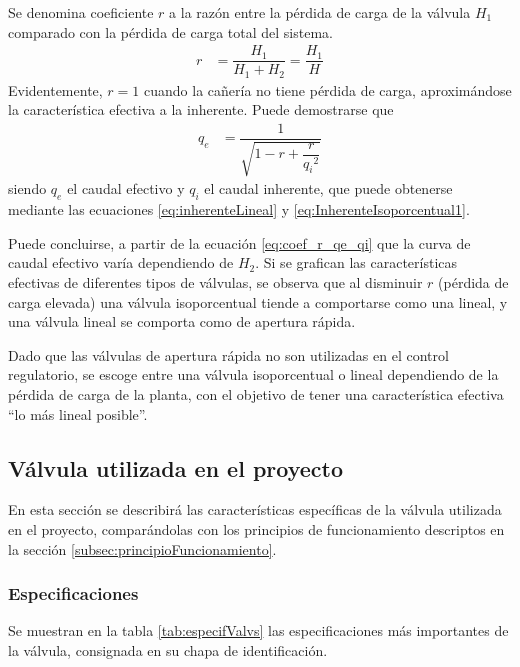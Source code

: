 Se denomina coeficiente $r$ a la razón entre la pérdida de carga de la válvula
$H_1$ comparado con la pérdida de carga total del sistema.
\begin{align}
 r &= \dfrac{H_1}{H_1+H_2} = \dfrac{H_1}{H}
\end{align}
Evidentemente, $r = 1$ cuando la cañería no tiene pérdida de carga,
aproximándose la característica efectiva a la inherente.
Puede demostrarse \cite{bib:Creus} que
\begin{align}
 q_e &= \dfrac{1}{\sqrt{1-r+\dfrac{r}{{q_i}^2}}}
 \label{eq:coef_r_qe_qi}
\end{align}
siendo $q_e$ el caudal efectivo y $q_i$ el caudal inherente, que puede
obtenerse mediante las ecuaciones \eqref{eq:inherenteLineal} y
\eqref{eq:InherenteIsoporcentual1}.

Puede concluirse, a partir de la ecuación \eqref{eq:coef_r_qe_qi} que la curva
de caudal efectivo varía dependiendo de $H_2$.
Si se grafican las características efectivas de diferentes tipos de válvulas,
se observa que al disminuir $r$ (pérdida de carga elevada) una válvula
isoporcentual tiende a comportarse como una lineal,
y una válvula lineal se comporta como de apertura rápida.

Dado que las válvulas de apertura rápida no son utilizadas en el control
regulatorio, se escoge entre una válvula isoporcentual o lineal dependiendo de
la pérdida de carga de la planta, con el objetivo de tener una característica
efectiva ``lo más lineal posible''.

\subsection{Válvula utilizada en el proyecto}

En esta sección se describirá las características específicas de la válvula
utilizada en el proyecto, comparándolas con los principios de funcionamiento
descriptos en la sección \ref{subsec:principioFuncionamiento}.

\subsubsection{Especificaciones}
Se muestran en la tabla \ref{tab:especifValvs} las especificaciones más
importantes de la válvula, consignada en su chapa de identificación.

